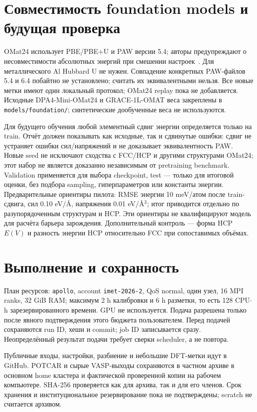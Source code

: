 \documentclass[11pt,a4paper]{article}
\begin{document}
\section{Совместимость foundation models и будущая проверка}
OMat24 использует PBE/PBE+U и PAW версии 5.4; авторы предупреждают о
несовместимости абсолютных энергий при смешении настроек~\cite{omat}.
Для металлического Al Hubbard U не нужен. Совпадение конкретных PAW-файлов
5.4 и 6.4 побайтно не установлено; считать их эквивалентными нельзя.
Все новые метки имеют один локальный протокол; OMat24 replay пока не добавляется.
Исходные DPA4-Mini-OMat24 и GRACE-1L-OMAT веса закреплены в
\texttt{models/foundation/}; синтетические дообученные веса не используются.

Для будущего обучения любой элементный сдвиг энергии определяется только
на train. Отчёт должен показывать как исходные, так и сдвинутые ошибки:
сдвиг не устраняет ошибки сил/напряжений и не доказывает эквивалентность PAW.
Новые seed не исключают сходства с FCC/HCP и другими структурами OMat24;
этот набор не является доказанно независимым от pretraining benchmark.
Validation применяется для выбора checkpoint, test --- только для итоговой
оценки, без подбора sampling, гиперпараметров или константы энергии.
Предварительные ориентиры пилота: RMSE энергии 10 meV/атом после train-сдвига,
сил 0.10 eV/\AA, напряжения 0.01 eV/\AA$^3$; итог приводится отдельно по
разупорядоченным структурам и HCP. Эти ориентиры не квалифицируют модель для
расчёта барьера зарождения. Дополнительный контроль --- форма HCP $E(V)$
и разность энергии HCP относительно FCC при сопоставимых объёмах.

\section{Выполнение и сохранность}
План ресурсов: \texttt{apollo}, account \texttt{imet-2026-2}, QoS normal,
один узел, 16 MPI ranks, 32 GiB RAM; максимум 2 h калибровки и 6 h разметки,
то есть 128 CPU$\cdot$h зарезервированного времени. GPU не используется.
Подача разрешена только после явного подтверждения этого бюджета пользователем.
Перед подачей сохраняются run ID, хеши и commit; job ID записывается сразу.
Неопределённый результат подачи требует сверки scheduler, а не повтора.

Публичные входы, настройки, разбиение и небольшие DFT-метки идут в GitHub.
POTCAR и сырые VASP-выходы сохраняются в частном архиве в основном home кластера
и фактической проверенной копии на рабочем компьютере. SHA-256 проверяется
как для архива, так и для его членов. Срок хранения и институциональное
резервирование пока не подтверждены; scratch не считается архивом.
\end{document}
